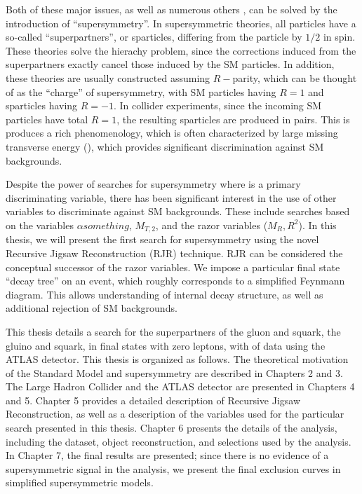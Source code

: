 Both of these major issues, as well as numerous others , can be solved by the introduction of ``supersymmetry''.
In supersymmetric theories, all particles have a so-called ``superpartners'', or sparticles, differing from the particle by $1/2$ in spin.
These theories solve the hierachy problem, since the corrections induced from the superpartners exactly cancel those induced by the SM particles.
In addition, these theories are usually constructed assuming $R-$parity, which can be thought of as the ``charge'' of supersymmetry, with SM particles having $R=1$ and sparticles having $R=-1$.
In collider experiments, since the incoming SM particles have total $R=1$, the resulting sparticles are produced in pairs.
This is produces a rich phenomenology, which is often characterized by large missing transverse energy (\met), which provides significant discrimination against SM backgrounds.

Despite the power of searches for supersymmetry where \met is a primary discriminating variable, there has been significant interest in the use of other variables to discriminate against SM backgrounds.
These include searches based on the variables $\alpha{something}$, $ M_{T,2}$, and the razor variables ($M_R, R^2$). 
In this thesis, we will present the first search for supersymmetry using the novel Recursive Jigsaw Reconstruction (RJR) technique.
RJR can be considered the conceptual successor of the razor variables.
We impose a particular final state ``decay tree'' on an event, which roughly corresponds to a simplified Feynmann diagram.
This allows understanding of internal decay structure, as well as additional rejection of SM backgrounds.

This thesis details a search for the superpartners of the gluon and squark, the gluino and squark, in final states with zero leptons, with \todo{ 7 \ifb} of data using the ATLAS detector.
This thesis is organized as follows.
The theoretical motivation of the Standard Model and supersymmetry are described in Chapters 2 and 3.
The Large Hadron Collider and the ATLAS detector are presented in Chapters 4 and 5.
Chapter 5 provides a detailed description of Recursive Jigsaw Reconstruction, as well as a description of the variables used for the particular search presented in this thesis.
Chapter 6 presents the details of the analysis, including the dataset, object reconstruction, and selections used by the analysis.
In Chapter 7, the final results are presented; since there is no evidence of a supersymmetric signal in the analysis, we present the final exclusion curves in simplified supersymmetric models.
